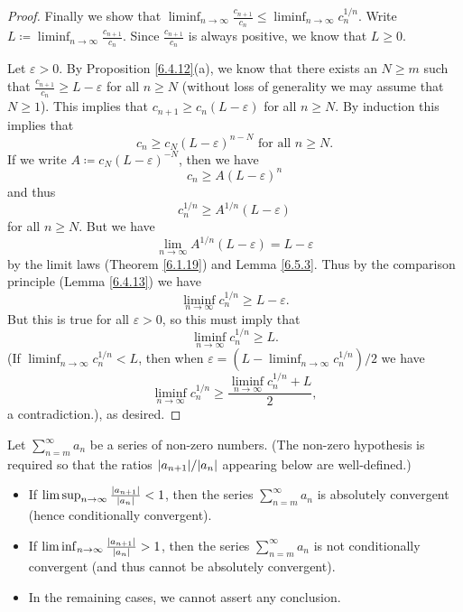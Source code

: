 \begin{proof}
    Finally we show that \(\liminf_{n \to \infty} \frac{c_{n + 1}}{c_n} \leq \liminf_{n \to \infty} c_n^{1 / n}\).
    Write \(L \coloneqq \liminf_{n \to \infty} \frac{c_{n + 1}}{c_n}\).
    Since \(\frac{c_{n + 1}}{c_n}\) is always positive, we know that \(L \geq 0\).

    Let \(\varepsilon > 0\).
    By Proposition \ref{6.4.12}(a), we know that there exists an \(N \geq m\) such that \(\frac{c_{n + 1}}{c_n} \geq L - \varepsilon\) for all \(n \geq N\)
    (without loss of generality we may assume that \(N \geq 1\)).
    This implies that \(c_{n + 1} \geq c_n (L - \varepsilon)\) for all \(n \geq N\).
    By induction this implies that
    \[
        c_n \geq c_N (L - \varepsilon)^{n - N} \text{ for all } n \geq N.
    \]
    If we write \(A \coloneqq c_N (L - \varepsilon)^{-N}\), then we have
    \[
        c_n \geq A(L - \varepsilon)^n
    \]
    and thus
    \[
        c_n^{1 / n} \geq A^{1 / n} (L - \varepsilon)
    \]
    for all \(n \geq N\).
    But we have
    \[
        \lim_{n \to \infty} A^{1 / n} (L - \varepsilon) = L - \varepsilon
    \]
    by the limit laws (Theorem \ref{6.1.19}) and Lemma \ref{6.5.3}.
    Thus by the comparison principle (Lemma \ref{6.4.13}) we have
    \[
        \liminf_{n \to \infty} c_n^{1 / n} \geq L - \varepsilon.
    \]
    But this is true for all \(\varepsilon > 0\), so this must imply that
    \[
        \liminf_{n \to \infty} c_n^{1 / n} \geq L.
    \]
    (If \(\liminf_{n \to \infty} c_n^{1 / n} < L\), then when \(\varepsilon = (L - \liminf_{n \to \infty} c_n^{1 / n}) / 2\) we have
    \[
        \liminf_{n \to \infty} c_n^{1 / n} \geq \frac{\liminf_{n \to \infty} c_n^{1 / n} + L}{2},
    \]
    a contradiction.), as desired.
\end{proof}

\begin{corollary}\label{7.5.3}
    Let \(\sum_{n = m}^\infty a_n\) be a series of non-zero numbers.
    (The non-zero hypothesis is required so that the ratios \(\abs*{a_{n + 1}} / \abs*{a_n}\) appearing below are well-defined.)
    \begin{itemize}
        \item If \(\limsup_{n \to \infty} \frac{\abs*{a_{n + 1}}}{\abs*{a_n}} < 1\), then the series \(\sum_{n = m}^\infty a_n\) is absolutely convergent (hence conditionally convergent).
        \item If \(\liminf_{n \to \infty} \frac{\abs*{a_{n + 1}}}{\abs*{a_n}} > 1\), then the series \(\sum_{n = m}^\infty a_n\) is not conditionally convergent (and thus cannot be absolutely convergent).
        \item In the remaining cases, we cannot assert any conclusion.
    \end{itemize}
\end{corollary}

